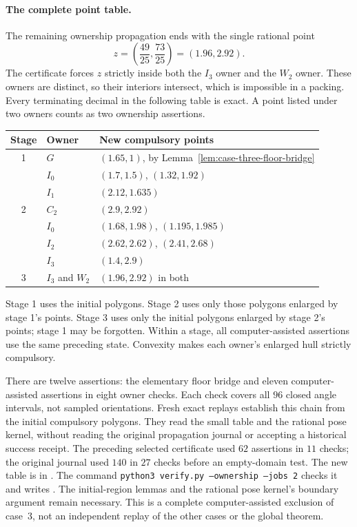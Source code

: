 \documentclass[11pt]{article}
\begin{document}
\paragraph{The complete point table.}
The remaining ownership propagation ends with the single rational point
\[
 z=\left(\frac{49}{25},\frac{73}{25}\right)=(1.96,2.92).
\]
The certificate forces $z$ strictly inside both the $I_3$ owner and the
$W_2$ owner.  These owners are distinct, so their interiors intersect,
which is impossible in a packing. Every terminating decimal in the
following table is exact. A point listed under two owners counts as two
ownership assertions.
\begin{center}
\begin{tabular}{cll}
\toprule
Stage & Owner & New compulsory points\\\midrule
1 & $G$ & $(1.65,1)$, by Lemma~\ref{lem:case-three-floor-bridge}\\
  & $I_0$ & $(1.7,1.5)$, $(1.32,1.92)$\\
  & $I_1$ & $(2.12,1.635)$\\\midrule
2 & $C_2$ & $(2.9,2.92)$\\
  & $I_0$ & $(1.68,1.98)$, $(1.195,1.985)$\\
  & $I_2$ & $(2.62,2.62)$, $(2.41,2.68)$\\
  & $I_3$ & $(1.4,2.9)$\\\midrule
3 & $I_3$ and $W_2$ & $(1.96,2.92)$ in both\\\bottomrule
\end{tabular}
\end{center}
Stage 1 uses the initial polygons. Stage 2 uses only those polygons
enlarged by stage 1's points. Stage 3 uses only the initial polygons
enlarged by stage 2's points; stage 1 may be forgotten. Within a stage,
all computer-assisted assertions use the same preceding state. Convexity
makes each owner's enlarged hull strictly compulsory.

There are twelve assertions: the elementary floor bridge and eleven
computer-assisted assertions in eight owner checks. Each check covers
all $96$ closed angle intervals, not sampled orientations. Fresh exact
replays establish this chain from the initial compulsory polygons. They
read the small table and the rational pose kernel, without reading the
original propagation journal or accepting a historical success receipt.
The preceding selected certificate used $62$ assertions in $11$ checks;
the original journal used $140$ in $27$ checks before an empty-domain test.
The new table is in
.
The command \texttt{python3 verify.py --ownership --jobs 2} checks it and
writes .
The initial-region lemmas and the rational pose kernel's boundary argument
remain necessary. This is a complete computer-assisted exclusion of
case~3, not an independent replay of the other cases or the global theorem.
\end{document}
